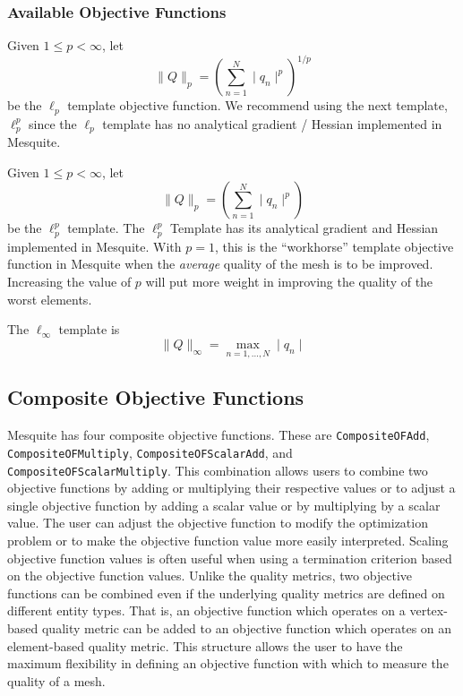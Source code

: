 \documentclass[letter]{report}
\begin{document}
\subsubsection{Available Objective Functions}

 \newline
Given $1 \leq p < \infty$, let
\begin{equation}
\| Q \|_p = ( \sum_{n=1}^N \mid q_n \mid^p )^{1/p}
\end{equation}
be the $\ell_p$ template objective function. We recommend using the next template, \
$\ell_p^p$ since the $\ell_p$ template has no analytical gradient / Hessian implemented in Mesquite.\newline

 \newline
Given $1 \leq p < \infty$, let 
\begin{equation}
\| Q \|_p = ( \sum_{n=1}^N \mid q_n \mid^p )
\end{equation}
be the 
$\ell_p^p$ template. The $\ell_p^p$ Template has its analytical gradient and Hessian implemented in
Mesquite. With $p=1$, this is the ``workhorse'' template objective function in Mesquite when the \emph{average}
quality of the mesh is to be improved. Increasing the value of $p$ will put more weight in improving
the quality of the worst elements. 
\newline

 \newline
The $\ell_{\infty}$ template is
\begin{equation}
\| Q \|_{\infty} = \max_{n=1,\ldots,N} \mid q_n \mid
\end{equation}


\subsection{Composite Objective Functions}

Mesquite has four composite objective functions.  These are
\texttt{CompositeOFAdd}, \texttt{CompositeOFMultiply}, \texttt{CompositeOFScalarAdd}, and
\texttt{CompositeOFScalarMultiply}.  This combination allows users
to combine two objective functions by adding or multiplying
their respective values or to adjust a single objective function
by adding a scalar value or by multiplying by a scalar value.  
The user can adjust the objective function to modify the
optimization problem or to make the objective function value
more easily interpreted.  Scaling objective function values
is often useful when using a termination criterion based on the
objective function values. Unlike the quality metrics, 
two objective functions can be combined
even if the underlying quality metrics are defined on different entity
types.  That is, an objective function which operates on a vertex-based
quality metric can be added to an objective function which operates
on an element-based quality metric.  This structure allows the user
to have the maximum flexibility in defining an objective function with
which to measure the quality of a mesh.
\end{document}
